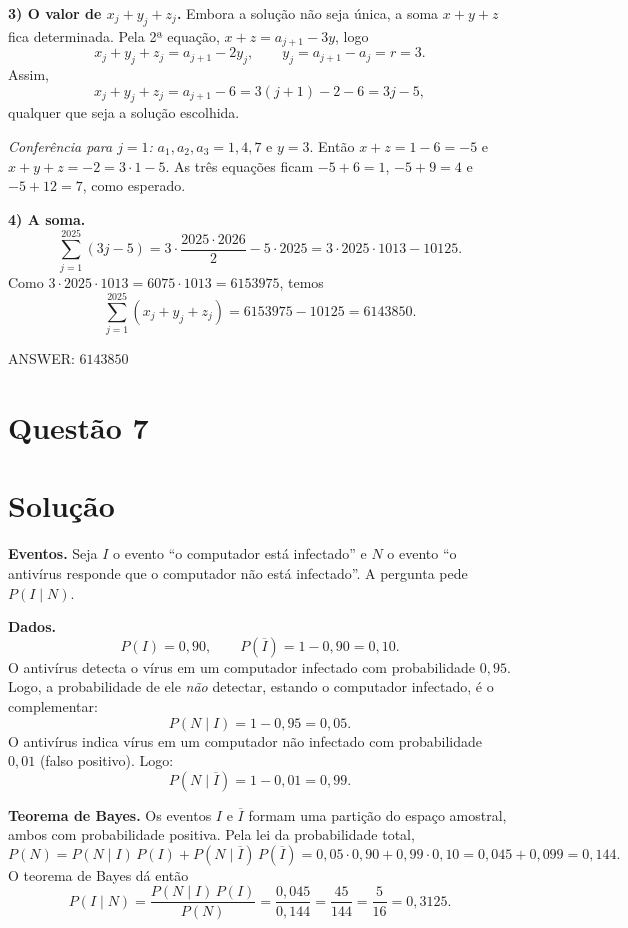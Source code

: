 \documentclass{article}%
\begin{document}
\textbf{3) O valor de $x_j+y_j+z_j$.} Embora a solução não seja única, a soma $x+y+z$ fica determinada. Pela 2ª equação, $x+z=a_{j+1}-3y$, logo
\[
x_j+y_j+z_j=a_{j+1}-2y_j,\qquad y_j=a_{j+1}-a_j=r=3 .
\]
Assim,
\[
x_j+y_j+z_j=a_{j+1}-6=3(j+1)-2-6=3j-5 ,
\]
qualquer que seja a solução escolhida.

\textit{Conferência para $j=1$:} $a_1,a_2,a_3=1,4,7$ e $y=3$. Então $x+z=1-6=-5$ e $x+y+z=-2=3\cdot1-5$. As três equações ficam $-5+6=1$, $-5+9=4$ e $-5+12=7$, como esperado.

\textbf{4) A soma.}
\[
\sum_{j=1}^{2025}(3j-5)=3\cdot\frac{2025\cdot2026}{2}-5\cdot2025
=3\cdot2025\cdot1013-10125 .
\]
Como $3\cdot2025\cdot1013=6075\cdot1013=6153975$, temos
\[
\sum_{j=1}^{2025}(x_j+y_j+z_j)=6153975-10125=6143850 .
\]

ANSWER: $6143850$%
\newpage%
\section*{Questão 7}

\section*{Solução}

\textbf{Eventos.} Seja $I$ o evento ``o computador está infectado'' e $N$ o evento ``o antivírus responde que o computador não está infectado''. A pergunta pede $P(I\mid N)$.

\textbf{Dados.}
\[
P(I)=0{,}90,\qquad P(\overline{I})=1-0{,}90=0{,}10 .
\]
O antivírus detecta o vírus em um computador infectado com probabilidade $0{,}95$. Logo, a probabilidade de ele \emph{não} detectar, estando o computador infectado, é o complementar:
\[
P(N\mid I)=1-0{,}95=0{,}05 .
\]
O antivírus indica vírus em um computador não infectado com probabilidade $0{,}01$ (falso positivo). Logo:
\[
P(N\mid \overline{I})=1-0{,}01=0{,}99 .
\]

\textbf{Teorema de Bayes.} Os eventos $I$ e $\overline{I}$ formam uma partição do espaço amostral, ambos com probabilidade positiva. Pela lei da probabilidade total,
\[
P(N)=P(N\mid I)\,P(I)+P(N\mid \overline{I})\,P(\overline{I})
=0{,}05\cdot 0{,}90+0{,}99\cdot 0{,}10=0{,}045+0{,}099=0{,}144 .
\]
O teorema de Bayes dá então
\[
P(I\mid N)=\frac{P(N\mid I)\,P(I)}{P(N)}=\frac{0{,}045}{0{,}144}=\frac{45}{144}=\frac{5}{16}=0{,}3125 .
\]
\end{document}
